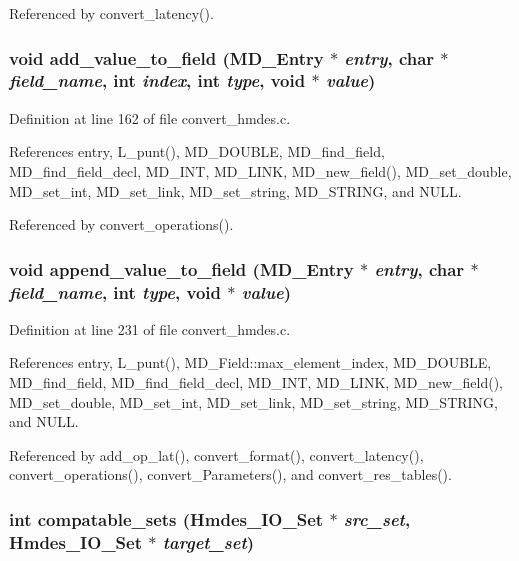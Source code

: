 Referenced by convert\_\-latency().
\subsubsection{\setlength{\rightskip}{0pt plus 5cm}void add\_\-value\_\-to\_\-field (\bf{MD\_\-Entry} $\ast$ {\em entry}, char $\ast$ {\em field\_\-name}, int {\em index}, int {\em type}, void $\ast$ {\em value})}\label{convert__hmdes_8c_26b31203d2cfec0406e930f19e4d534f}




Definition at line 162 of file convert\_\-hmdes.c.

References entry, L\_\-punt(), MD\_\-DOUBLE, MD\_\-find\_\-field, MD\_\-find\_\-field\_\-decl, MD\_\-INT, MD\_\-LINK, MD\_\-new\_\-field(), MD\_\-set\_\-double, MD\_\-set\_\-int, MD\_\-set\_\-link, MD\_\-set\_\-string, MD\_\-STRING, and NULL.

Referenced by convert\_\-operations().
\subsubsection{\setlength{\rightskip}{0pt plus 5cm}void append\_\-value\_\-to\_\-field (\bf{MD\_\-Entry} $\ast$ {\em entry}, char $\ast$ {\em field\_\-name}, int {\em type}, void $\ast$ {\em value})}\label{convert__hmdes_8c_9865cd40b273eaa099d6d14d1c38c186}




Definition at line 231 of file convert\_\-hmdes.c.

References entry, L\_\-punt(), MD\_\-Field::max\_\-element\_\-index, MD\_\-DOUBLE, MD\_\-find\_\-field, MD\_\-find\_\-field\_\-decl, MD\_\-INT, MD\_\-LINK, MD\_\-new\_\-field(), MD\_\-set\_\-double, MD\_\-set\_\-int, MD\_\-set\_\-link, MD\_\-set\_\-string, MD\_\-STRING, and NULL.

Referenced by add\_\-op\_\-lat(), convert\_\-format(), convert\_\-latency(), convert\_\-operations(), convert\_\-Parameters(), and convert\_\-res\_\-tables().
\subsubsection{\setlength{\rightskip}{0pt plus 5cm}int compatable\_\-sets (\bf{Hmdes\_\-IO\_\-Set} $\ast$ {\em src\_\-set}, \bf{Hmdes\_\-IO\_\-Set} $\ast$ {\em target\_\-set})}\label{convert__hmdes_8c_a1538bee109770d069d4df477d332a23}




